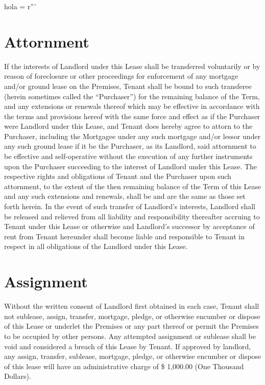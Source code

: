 hola = r'''\documentclass{article}
\begin{document}
\section{Attornment}
    If the interests of Landlord under this Lease shall be transferred voluntarily or by reason of foreclosure or other proceedings for enforcement of any mortgage and/or ground lease on the Premises, Tenant shall be bound to such transferee (herein sometimes called the ``Purchaser'') for the remaining balance of the Term, and any extensions or renewals thereof which may be effective in accordance with the terms and provisions hereof with the same force and effect as if the Purchaser were Landlord under this Lease, and Tenant does hereby agree to attorn to the Purchaser, including the Mortgagee under any such mortgage and/or lessor under any such ground lease if it be the Purchaser, as its Landlord, said attornment to be effective and self-operative without the execution of any further instruments upon the Purchaser succeeding to the interest of Landlord under this Lease. The respective rights and obligations of Tenant and the Purchaser upon such attornment, to the extent of the then remaining balance of the Term of this Lease and any such extensions and renewals, shall be and are the same as those set forth herein. In the event of such transfer of Landlord's interests, Landlord shall be released and relieved from all liability and responsibility thereafter accruing to Tenant under this Lease or otherwise and Landlord's successor by acceptance of rent from Tenant hereunder shall become liable and responsible to Tenant in respect in all obligations of the Landlord under this Lease.

\section{Assignment}
    Without the written consent of Landlord first obtained in each case, Tenant shall not sublease, assign, transfer, mortgage, pledge, or otherwise encumber or dispose of this Lease or underlet the Premises or any part thereof or permit the Premises to be occupied by other persons. Any attempted assignment or sublease shall be void and considered a breach of this Lease by Tenant.  If approved by landlord, any assign, transfer, sublease, mortgage, pledge, or otherwise encumber or dispose of this lease will have an administrative charge of \$ 1,000.00 (One Thousand Dollars).
\end{document}
